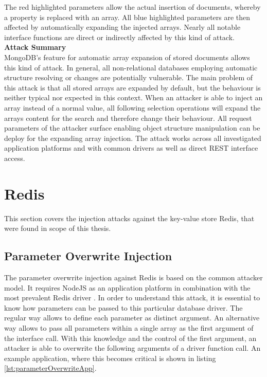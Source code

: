 The red highlighted parameters allow the actual insertion of documents, whereby a property is replaced with an array. All blue highlighted parameters are then affected by automatically expanding the injected arrays. Nearly all notable interface functions are direct or indirectly affected by this kind of attack. \\

\textbf{Attack Summary} \\
MongoDB's feature for automatic array expansion of stored documents allows this kind of attack. In general, all non-relational databases employing automatic structure resolving or changes are potentially vulnerable. The main problem of this attack is that all stored arrays are expanded by default, but the behaviour is neither typical nor expected in this context. When an attacker is able to inject an array instead of a normal value, all following selection operations will expand the arrays content for the search and therefore change their behaviour. All request parameters of the attacker surface enabling object structure manipulation can be deploy for the expanding array injection. The attack works across all investigated application platforms and with common drivers as well as direct REST interface access. 

\section{Redis}
This section covers the injection attacks against the key-value store Redis, that were found in scope of this thesis.

\subsection{Parameter Overwrite Injection}
The parameter overwrite injection against Redis is based on the common attacker model. It requires NodeJS as an application platform in combination with the most prevalent Redis driver \cite{Ranney2016}. In order to understand this attack, it is essential to know how parameters can be passed to this particular database driver. The regular way allows to define each parameter as distinct argument. An alternative way allows to pass all parameters within a single array as the first argument of the interface call. With this knowledge and the control of the first argument, an attacker is able to overwrite the following arguments of a driver function call. An example application, where this becomes critical is shown in listing \ref{lst:parameterOverwriteApp}. \\

